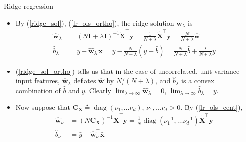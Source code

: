 \documentclass{beamer}
\numberwithin{equation}{section}
\newcommand{\aref}[1]{\alert{\ref{#1}}}
\begin{document}
\begin{frame}{Ridge regression}
    \begin{itemize}
        \item
        By (\aref{ridge_sol}), (\aref{lr_ols_ortho}), the ridge solution
        $ \hat{\mathbf{w}}_\lambda $ is
        \begin{equation} \label{ridge_sol_ortho}
            \begin{split}
	            \hat{\mathbf{w}}_\lambda & =
	            (N\mathbf{I} + \lambda\mathbf{I})^{-1}
	            \tilde{\mathbf{X}}^\top\mathbf{y} =
	            \frac{1}{N + \lambda}\tilde{\mathbf{X}}^\top\mathbf{y} =
	            \boxed{\frac{N}{N + \lambda}\hat{\mathbf{w}}} \\
	            \hat{b}_\lambda & = \bar{y} - \hat{\mathbf{w}}_\lambda^\top
	            \bar{\mathbf{x}} = \bar{y} - \frac{N}{N + \lambda}
	            (\bar{y} - \hat{b}) =
	            \boxed{
	                \frac{N}{N + \lambda}\hat{b} +
	                \frac{\lambda}{N + \lambda}\bar{y}
	            }
            \end{split}
        \end{equation}

        \item
        (\aref{ridge_sol_ortho}) tells us that in the case of uncorrelated,
        unit variance input features, $ \hat{\mathbf{w}}_\lambda $
        deflates $ \hat{\mathbf{w}} $ by $ N / (N + \lambda) $, and
        $ \hat{b}_\lambda $ is a convex combination of $ \hat{b} $ and
        $ \bar{y} $. Clearly $ \lim_{\lambda \rightarrow \infty}
        \hat{\mathbf{w}}_\lambda = \mathbf{0} $,
        $ \lim_{\lambda \rightarrow \infty}\hat{b}_\lambda = \bar{y} $.

        \item
        Now suppose that $ \mathbf{C}_\mathbf{X} \triangleq
        \operatorname{diag}(\nu_1, \ldots \nu_d) $,
        $ \nu_1, \ldots \nu_d > 0 $. By (\aref{lr_ols_cent}),
        \begin{equation} \label{lr_ols_diag}
            \begin{split}
                \hat{\mathbf{w}}_\nu & = (N\mathbf{C}_\mathbf{X})^{-1}
	            \tilde{\mathbf{X}}^\top\mathbf{y} =
	            \frac{1}{N}\operatorname{diag}\left(
	                \nu_1^{-1}, \ldots \nu_d^{-1}
	            \right)
	            \tilde{\mathbf{X}}^\top\mathbf{y} \\
	            \hat{b}_\nu & = \bar{y} - \hat{\mathbf{w}}_\nu^\top
	            \bar{\mathbf{x}}
            \end{split}
        \end{equation}
    \end{itemize}
\end{frame}
\end{document}
